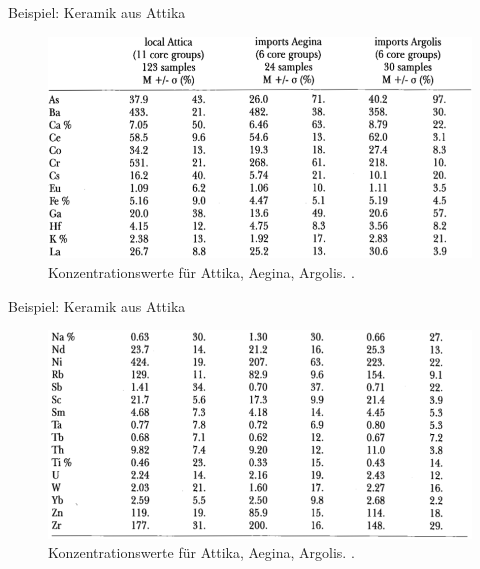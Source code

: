 \documentclass[xcolor=x11names, aspectratio=169]{beamer}
\begin{document}
{
\begin{frame}[plain]
\end{frame}
}


\begin{frame}{Beispiel: Keramik aus Attika}
\begin{figure}
\includegraphics[width=.85\textwidth]{img/table-1.png}
\caption{Konzentrationswerte für Attika, Aegina, Argolis. \cite{mommsen2003}.}
\end{figure}
\end{frame}

\begin{frame}{Beispiel: Keramik aus Attika}
\begin{figure}
\includegraphics[width=.9\textwidth]{img/table-2.png}
\caption{Konzentrationswerte für Attika, Aegina, Argolis. \cite{mommsen2003}.}
\end{figure}
\end{frame}
\end{document}
